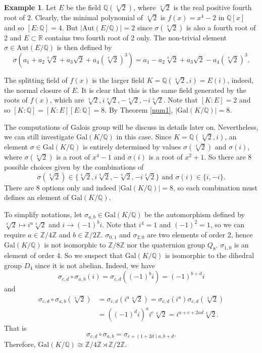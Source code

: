 \documentclass[12pt]{report}
\theoremstyle{definition}
\newtheorem{example}[theorem]{Example}
\newcommand{\Aut}{\text{Aut}}
\newcommand{\Gal}{\text{Gal}}
\newcommand{\ZZ}{\mathbb{Z}}
\newcommand{\QQ}{\mathbb{Q}}
\newcommand{\RR}{\mathbb{R}}
\begin{document}
\begin{example}
	Let $E$ be the field $\QQ(\sqrt[4]{2})$, where $\sqrt[4]{2}$ is the real positive fourth root of $2$. Clearly, the minimal polynomial of $\sqrt[4]{2}$ is $f(x)=x^4-2$ in $\QQ[x]$ and so $[E:\QQ]=4$. But $|\Aut(E/\QQ)|=2$ since $\sigma(\sqrt[4]{2})$ is also a fourth root of 2 and $E\subset \RR$ contains two fourth root of 2 only. The non-trivial element $\sigma\in\Aut(E/\QQ)$ is then defined by $$\sigma(a_1+a_2\sqrt[4]{2} +a_3\sqrt{2} +a_4 (\sqrt[4]{2})^3) =a_1-a_2\sqrt[4]{2} +a_3\sqrt{2} -a_4 (\sqrt[4]{2})^3.$$


	The splitting field of $f(x)$ is the larger field $K=\QQ(\sqrt[4]{2},i)=E(i)$, indeed, the normal closure of $E$. It is clear that this is the same field generated by the roots of $f(x)$, which are $\sqrt[4]{2},i\sqrt[4]{2},-\sqrt[4]{2},-i\sqrt[4]{2}$. Note that $[K:E]=2$ and so $[K:\QQ]=[K:E][E:\QQ]=8$. By Theorem \ref{num1}, $|\Gal(K/\QQ)|=8$.

	The computations of Galois group will be discuss in details later on. Nevertheless, we can still investigate $\Gal(K/\QQ)$ in this case. Since $K=\QQ(\sqrt[4]{2},i)$, an element $\sigma\in \Gal(K/\QQ)$ is entirely determined by values $\sigma(\sqrt[4]{2})$ and $\sigma(i)$, where $\sigma(\sqrt[4]{2})$ is a root of $x^4-1$ and $\sigma(i)$ is a root of $x^2+1$. So there are 8 possible choices given by the combinations of $$\sigma(\sqrt[4]{2})\in\{\sqrt[4]{2},i\sqrt[4]{2},-\sqrt[4]{2},-i\sqrt[4]{2}\}\mbox{ and }\sigma(i)\in\{i,-i\}.$$
	There are 8 options only and indeed $|\Gal(K/\QQ)|=8$, so each combination must defines an element of $\Gal(K/\QQ)$.

	To simplify notations, let $\sigma_{a,b}\in \Gal(K/\QQ)$ be the automorphism defined by $\sqrt[4]{2}\mapsto i^a \sqrt[4]{2}$ and $i\to (-1)^bi$. Note that $i^4=1$ and $(-1)^2=1$, so we can require $a\in\ZZ/4\ZZ$ and $b\in \ZZ/2\ZZ$. $\sigma_{0,1}$ and $\sigma_{2,0}$ are two elements of order 2, hence $\Gal(K/\QQ)$ is not isomorphic to $\ZZ/8\ZZ$ nor the quaternion group $Q_8$. $\sigma_{1,0}$ is an element of order 4. So we suspect that $\Gal(K/\QQ)$ is isomorphic to the dihedral group $D_4$ since it is not abelian. Indeed, we have $$\sigma_{c,d}\circ\sigma_{a,b}(i) = \sigma_{c,d}((-1)^b i) = (-1)^{b+d} i$$
	and \begin{align*}
		\sigma_{c,d}\circ\sigma_{a,b}(\sqrt[4]{2}) & = \sigma_{c,d}(i^a \sqrt[4]{2}) =  \sigma_{c,d}(i^a)\sigma_{c,d}(\sqrt[4]{2}) \\
		                                           & = ((-1)^d i)^a i^c\sqrt[4]{2} = i^{a+c+2ad} \sqrt[4]{2}.
	\end{align*}
	That is $$\sigma_{c,d}\circ\sigma_{a,b} = \sigma_{c+(1+2d)a,b+d}.$$ Therefore, $\Gal(K/\QQ) \cong \ZZ/4\ZZ \rtimes \ZZ/2\ZZ.$
\end{example}
\end{document}
